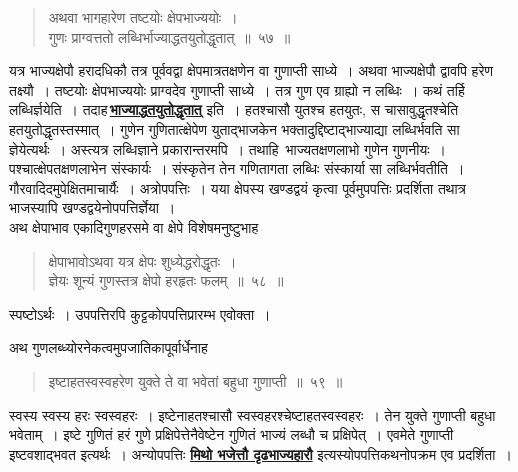 \documentclass[11pt, openany]{book}
\begin{document}
{{ \label{57}
\begin{quote}
    \ab 
    अथवा भागहारेण तष्टयोः क्षेपभाज्ययोः~। \\
 गुणः प्राग्वत्ततो लब्धिर्भाज्याद्धतयुतोद्धृतात्~॥~५७~॥~
\end{quote}
 
 यत्र भाज्यक्षेपौ हरादधिकौ तत्र पूर्ववद्वा क्षेपमात्रतक्षणेन वा
गुणाप्ती साध्ये~। अथवा भाज्यक्षेपौ द्वावपि हरेण तक्ष्यौ~। तष्टयोः क्षेपभाज्ययोः 
प्राग्वदेव गुणाप्ती साध्ये~। तत्र गुण एव ग्राह्यो न लब्धिः~। कथं तर्हि
लब्धिर्ज्ञयेति~। तदाह\textendash \,\hyperref[57]{\textbf{भाज्याद्धतयुतोद्धृतात्}} इति~। हतश्चासौ
युतश्च हतयुतः, स  चासावुद्धृतश्चेति हतयुतोद्धृतस्तस्मात्~। गुणेन गुणितात्क्षेपेण
युताद्भाजकेन भक्तादुद्दिष्टाद्भाज्याद्या लब्धिर्भवति सा ज्ञेयेत्यर्थः~। अस्त्यत्र
लब्धिज्ञाने प्रकारान्तरमपि~। 
तथाहि\textendash\  भाज्यतक्षणलाभो गुणेन गुणनीयः~। पश्चात्क्षेपतक्षणलाभेन संस्कार्यः~। 
संस्कृतेन तेन गणितागता लब्धिः संस्कार्या सा लब्धिर्भवतीति~। गौरवादिदमुपेक्षितमाचार्यैः~। अत्रोपपत्तिः~। यया क्षेपस्य खण्डद्वयं कृत्वा
पूर्वमुपपत्तिः प्रदर्शिता तथात्र भाजस्यापि खण्डद्वयेनोपपत्तिर्ज्ञेया~। \\

\vspace{-4mm}
 अथ क्षेपाभाव एकादिगुणहरसमे वा क्षेपे विशेषमनुष्टुभाह\textendash

 \label{58}
 \begin{quote}
     \ab 
      क्षेपाभावोऽथवा यत्र क्षेपः शुध्येद्धरोद्धृतः~। \\
 ज्ञेयः शून्यं गुणस्तत्र क्षेपो हरहृतः फलम्~॥~५८~॥~
 \end{quote}
\newpage
 स्पष्टोऽर्थः~। उपपत्तिरपि कुट्टकोपपत्तिप्रारम्भ एवोक्ता~। \\
\vspace{-4mm}

अथ गुणलब्ध्योरनेकत्वमुपजातिकापूर्वार्धेनाह\textendash
 
 \label{59}
\begin{quote}
    \ab 
    इष्टाहतस्वस्वहरेण युक्ते ते वा भवेतां बहुधा गुणाप्ती~॥~५९~॥~
\end{quote}

 स्वस्य स्वस्य हरः स्वस्वहरः~। इष्टेनाहतश्चासौ
स्वस्वहरश्चेष्टाहतस्वस्वहरः~। तेन  युक्ते गुणाप्ती बहुधा भवेताम्~। इष्टे गुणितं
हरं गुणे प्रक्षिपेत्तेनैवेष्टेन गुणितं भाज्यं लब्धौ च प्रक्षिपेत्~। एवमेते
गुणाप्ती इष्टवशाद्भवत इत्यर्थः~। अन्योपपत्तिः \hyperref[51]{\textbf{मिथो भजेत्तौ दृढभाज्यहारौ}} 
इत्यस्योपपत्तिकथनोपक्रम एव प्रदर्शिता~। \\

}}
\end{document}
